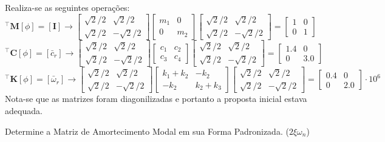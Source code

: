 \documentclass{article}
\begin{document}
\begin{resolution}
    Realiza-se as seguintes operações:
    \begin{equation*}
        [\phi]^\intercal \mathbf{M} [\phi] = [\mathbf{I}] \to 
        \begin{bmatrix} \sqrt{2}/2 & \sqrt{2}/2\\ \sqrt{2}/2 & -\sqrt{2}/2 \end{bmatrix} 
        \begin{bmatrix} m_1 & 0\\ 0 & m_2\end{bmatrix} 
        \begin{bmatrix} \sqrt{2}/2 & \sqrt{2}/2\\ \sqrt{2}/2 & -\sqrt{2}/2 \end{bmatrix} =
        \begin{bmatrix} 1 & 0\\ 0 & 1\end{bmatrix}
    \end{equation*}
    \begin{equation*}
        [\phi]^\intercal \mathbf{C} [\phi] = [\bar{c}_r] \to 
        \begin{bmatrix} \sqrt{2}/2 & \sqrt{2}/2\\ \sqrt{2}/2 & -\sqrt{2}/2 \end{bmatrix} 
        \begin{bmatrix} c_1 & c_2\\ c_3 & c_4\end{bmatrix}
        \begin{bmatrix} \sqrt{2}/2 & \sqrt{2}/2\\ \sqrt{2}/2 & -\sqrt{2}/2 \end{bmatrix} =
        \begin{bmatrix} 1.4 & 0\\ 0 & 3.0\end{bmatrix}
    \end{equation*}
    \begin{equation*}
        [\phi]^\intercal \mathbf{K} [\phi] = [\bar{\omega}_r] \to 
        \begin{bmatrix} \sqrt{2}/2 & \sqrt{2}/2\\ \sqrt{2}/2 & -\sqrt{2}/2 \end{bmatrix} 
        \begin{bmatrix} k_1 + k_2 & -k_2\\ -k_2 & k_2 + k_3\end{bmatrix} 
        \begin{bmatrix} \sqrt{2}/2 & \sqrt{2}/2\\ \sqrt{2}/2 & -\sqrt{2}/2 \end{bmatrix} =
        \begin{bmatrix} 0.4 & 0\\ 0 & 2.0\end{bmatrix} \cdot 10^{6}
    \end{equation*}
    Nota-se que as matrizes foram diagonilizadas e portanto a proposta inicial estava adequada.
\end{resolution}


\newpage\begin{exercise}\label{ex14}
    Determine a Matriz de Amortecimento Modal em sua Forma Padronizada. ($2\xi\omega_n$)
\end{exercise}
\begin{resolution}
    
\end{resolution}
\end{document}
